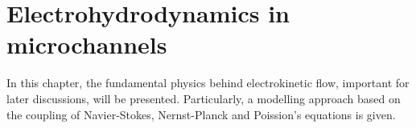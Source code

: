 \chapter{Electrohydrodynamics in microchannels}\label{sec:et}

In this chapter, the fundamental physics behind electrokinetic flow,
important for later discussions, will be presented. Particularly, a
modelling approach based on the coupling of Navier-Stokes,
Nernst-Planck and Poission's equations is given.



















